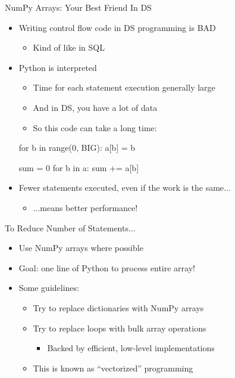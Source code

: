 \documentclass[aspectratio=169]{beamer}
\begin{document}
\begin{frame}[fragile]{NumPy Arrays: Your Best Friend In DS}

\begin{itemize}
\item Writing control flow code in DS programming is BAD
        \begin{itemize}
	\item Kind of like in SQL
        \end{itemize}
\item Python is interpreted
        \begin{itemize}
	\item Time for each statement execution generally large
	\item And in DS, you have a lot of data
	\item So this code can take a long time:
        \end{itemize}
\begin{SQL}
for b in range(0, BIG):
   a[b] = b
 
sum = 0
for b in a:
   sum += a[b]
\end{SQL}

\item Fewer statements executed, even if the work is the same...
	\begin{itemize}
	\item ...means better performance!
	\end{itemize}
\end{itemize}
\end{frame}

\begin{frame}{To Reduce Number of Statements...}

\begin{itemize}
\item Use NumPy arrays where possible
\item Goal: one line of Python to process entire array!
\item Some guidelines:
	\begin{itemize}
	\item Try to replace dictionaries with NumPy arrays
	\item Try to replace loops with bulk array operations
	\begin{itemize}
	\item Backed by efficient, low-level implementations
	\end{itemize}
	\item This is known as ``vectorized'' programming
	\end{itemize}
\end{itemize}
\end{frame}
\end{document}
